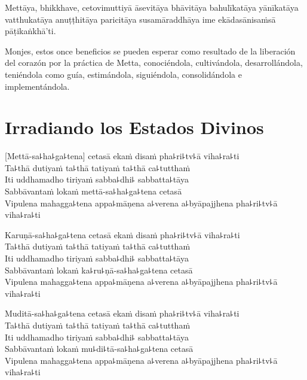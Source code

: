 Mettāya, bhikkhave, cetovimuttiyā āsevitāya bhāvitāya bahulīkatāya yānīkatāya vatthukatāya anuṭṭhitāya paricitāya susamāraddhāya ime ekādasānisaṁsā pāṭikaṅkhā'ti.

\begin{english}
  Monjes, estos once beneficios se pueden esperar como resultado de la liberación del corazón por la práctica de Metta, conociéndola, cultivándola, desarrollándola, teniéndola como guía, estimándola, siguiéndola, consolidándola e implementándola.
\end{english}

\chapter[Irradiando los Estados Divinos]{Irradiando los Estados Divinos}

\delegateSetUseNext


\begin{leader}
\end{leader}

[Mettā-sa꜕ha꜕ga꜕tena] cetasā ekaṁ disaṁ pha꜕ri꜕tv꜕ā viha꜕ra꜕ti\\
Ta꜕thā dutiyaṁ ta꜕thā tatiyaṁ ta꜕thā ca꜕tutthaṁ\\
Iti uddhamadho tiriyaṁ sabba꜕dhi꜕ sabbatta꜕tāya\\
Sabbāvantaṁ lokaṁ mettā-sa꜕ha꜕ga꜕tena cetasā\\
Vipulena mahagga꜕tena appa꜕māṇena a꜕verena a꜕byāpajjhena pha꜕ri꜕tv꜕ā viha꜕ra꜕ti

\enlargethispage{3\baselineskip}

Karuṇā-sa꜕ha꜕ga꜕tena cetasā ekaṁ disaṁ pha꜕ri꜕tv꜕ā viha꜕ra꜕ti\\
Ta꜕thā dutiyaṁ ta꜕thā tatiyaṁ ta꜕thā ca꜕tutthaṁ\\
Iti uddhamadho tiriyaṁ sabba꜕dhi꜕ sabbatta꜕tāya\\
Sabbāvantaṁ lokaṁ ka꜕ru꜕ṇā-sa꜕ha꜕ga꜕tena cetasā\\
Vipulena mahagga꜕tena appa꜕māṇena a꜕verena a꜕byāpajjhena pha꜕ri꜕tv꜕ā viha꜕ra꜕ti

Muditā-sa꜕ha꜕ga꜕tena cetasā ekaṁ disaṁ pha꜕ri꜕tv꜕ā viha꜕ra꜕ti\\
Ta꜕thā dutiyaṁ ta꜕thā tatiyaṁ ta꜕thā ca꜕tutthaṁ\\
Iti uddhamadho tiriyaṁ sabba꜕dhi꜕ sabbatta꜕tāya\\
Sabbāvantaṁ lokaṁ mu꜕di꜕tā-sa꜕ha꜕ga꜕tena cetasā\\
Vipulena mahagga꜕tena appa꜕māṇena a꜕verena a꜕byāpajjhena pha꜕ri꜕tv꜕ā viha꜕ra꜕ti

